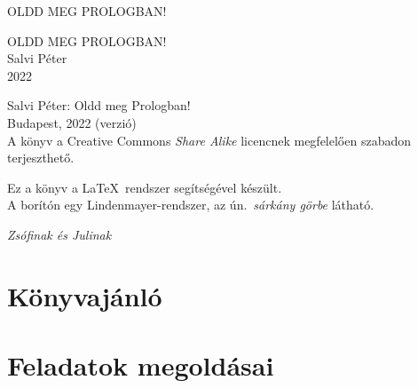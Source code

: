 \documentclass[a5paper]{book}
\begin{document}
\frontmatter
{}



\thispagestyle{empty}
\newpage

\begin{titlepage}
\thispagestyle{empty}
\centering
\vspace*{2cm}
{\large OLDD MEG PROLOGBAN!}
\end{titlepage}

\thispagestyle{empty}
\newpage

\begin{titlepage}
\centering
\vspace*{2cm}
{\Large OLDD MEG PROLOGBAN!}\\
\vspace{8cm}
{\large Salvi Péter}\\
\vspace{1em}
2022
\end{titlepage}

\thispagestyle{empty}
\begin{center}
  \small
  Salvi Péter: Oldd meg Prologban!\\
  Budapest, 2022 (verzió)\\
  \bigskip
  A könyv a Creative Commons \emph{Share Alike} licencnek megfelelően
  szabadon terjeszthető.
\end{center}
\vspace*{\fill}
{\footnotesize Ez a könyv a \LaTeX\ rendszer segítségével készült.\\
  A borítón egy Lindenmayer-rendszer, az ún.~\emph{sárkány görbe} látható.
}

\clearpage
\thispagestyle{empty}
\begin{center}
  \vspace*{\fill}
  {\Large\emph{Zsófinak és Julinak}}
  \vspace*{\fill}
\end{center}
\clearpage

\thispagestyle{empty}
\newpage

\addtocounter{page}{2}

\tableofcontents



\mainmatter
{}









\backmatter

\chapter{Könyvajánló}


\chapter{Feladatok megoldásai}


\printindex
\end{document}
